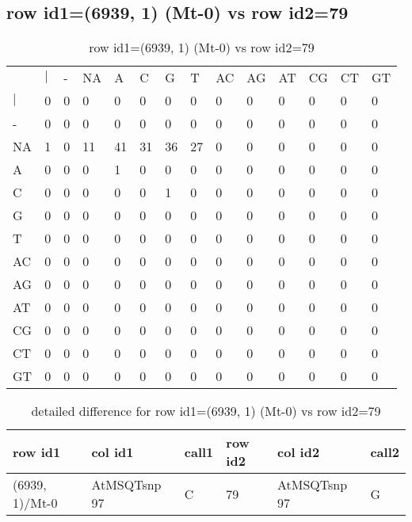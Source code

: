 \subsection{row id1=(6939, 1) (Mt-0) vs row id2=79}
\begin{center}
\begin{longtable}{|l|l|l|l|l|l|l|l|l|l|l|l|l|l|}
\caption{row id1=(6939, 1) (Mt-0) vs row id2=79} \label{table_dm146}\\
\hline
\\
\hline
&$|$&-&NA&A&C&G&T&AC&AG&AT&CG&CT&GT\\
$|$&0&0&0&0&0&0&0&0&0&0&0&0&0\\
-&0&0&0&0&0&0&0&0&0&0&0&0&0\\
NA&1&0&11&41&31&36&27&0&0&0&0&0&0\\
A&0&0&0&1&0&0&0&0&0&0&0&0&0\\
C&0&0&0&0&0&1&0&0&0&0&0&0&0\\
G&0&0&0&0&0&0&0&0&0&0&0&0&0\\
T&0&0&0&0&0&0&0&0&0&0&0&0&0\\
AC&0&0&0&0&0&0&0&0&0&0&0&0&0\\
AG&0&0&0&0&0&0&0&0&0&0&0&0&0\\
AT&0&0&0&0&0&0&0&0&0&0&0&0&0\\
CG&0&0&0&0&0&0&0&0&0&0&0&0&0\\
CT&0&0&0&0&0&0&0&0&0&0&0&0&0\\
GT&0&0&0&0&0&0&0&0&0&0&0&0&0\\
\hline
\end{longtable}
\end{center}

\begin{center}
\begin{longtable}{|l|l|l|l|l|l|}
\caption{detailed difference for row id1=(6939, 1) (Mt-0) vs row id2=79} \label{table_dm147}\\
\hline
row id1&col id1&call1&row id2&col id2&call2\\
\hline
(6939, 1)/Mt-0&AtMSQTsnp 97&C&79&AtMSQTsnp 97&G\\
\hline
\end{longtable}
\end{center}


